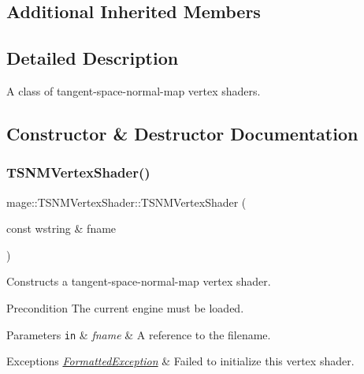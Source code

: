 \subsection*{Additional Inherited Members}


\subsection{Detailed Description}
A class of tangent-\/space-\/normal-\/map vertex shaders. 

\subsection{Constructor \& Destructor Documentation}
\hypertarget{classmage_1_1_t_s_n_m_vertex_shader_a4cba7b2ef6a6d972560db25ccae7cf37}{}\label{classmage_1_1_t_s_n_m_vertex_shader_a4cba7b2ef6a6d972560db25ccae7cf37} 
\subsubsection{\texorpdfstring{T\+S\+N\+M\+Vertex\+Shader()}{TSNMVertexShader()}\hspace{0.1cm}{\footnotesize\ttfamily [1/6]}}
{\footnotesize\ttfamily mage\+::\+T\+S\+N\+M\+Vertex\+Shader\+::\+T\+S\+N\+M\+Vertex\+Shader (\begin{DoxyParamCaption}\item[{const wstring \&}]{fname }\end{DoxyParamCaption})\hspace{0.3cm}{\ttfamily [explicit]}}

Constructs a tangent-\/space-\/normal-\/map vertex shader.

\begin{DoxyPrecond}{Precondition}
The current engine must be loaded. 
\end{DoxyPrecond}

\begin{DoxyParams}[1]{Parameters}
\mbox{\tt in}  & {\em fname} & A reference to the filename. \\
\hline
\end{DoxyParams}

\begin{DoxyExceptions}{Exceptions}
{\em \hyperlink{structmage_1_1_formatted_exception}{Formatted\+Exception}} & Failed to initialize this vertex shader. \\
\hline
\end{DoxyExceptions}
\hypertarget{classmage_1_1_t_s_n_m_vertex_shader_a08778a7323099f0002a639e95dde5ad3}{}\label{classmage_1_1_t_s_n_m_vertex_shader_a08778a7323099f0002a639e95dde5ad3} 
